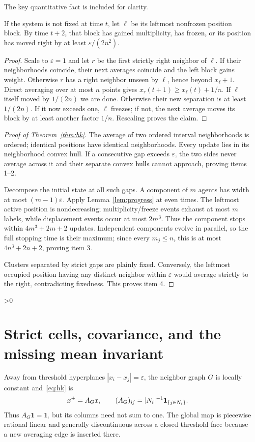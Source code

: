 \documentclass[10pt]{article}
\providecommand{\CRevisionRound}{2}
\begin{document}
The key quantitative fact is included for clarity.
\begin{lemma}\label{lem:progress}
If the system is not fixed at time $t$, let $\ell$ be its leftmost nonfrozen
position block.  By time $t+2$, that block has gained multiplicity, has
frozen, or its position has moved right by at least
$\varepsilon/(2n^2)$.
\end{lemma}
\begin{proof}
Scale to $\varepsilon=1$ and let $r$ be the first strictly right neighbor of
$\ell$.  If their neighborhoods coincide, their next averages coincide and
the left block gains weight.  Otherwise $r$ has a right neighbor unseen by
$\ell$, hence beyond $x_\ell+1$.  Direct averaging over at most $n$ points
gives $x_r(t+1)\ge x_\ell(t)+1/n$.  If $\ell$ itself moved by $1/(2n)$ we
are done.  Otherwise their new separation is at least $1/(2n)$.  If it now
exceeds one, $\ell$ freezes; if not, the next average moves its block by at
least another factor $1/n$.  Rescaling proves the claim.
\end{proof}
\begin{proof}[Proof of Theorem~\ref{thm:hk}]
The average of two ordered interval neighborhoods is ordered; identical
positions have identical neighborhoods.  Every update lies in its
neighborhood convex hull.  If a consecutive gap exceeds $\varepsilon$, the
two sides never average across it and their separate convex hulls cannot
approach, proving items 1--2.

Decompose the initial state at all such gaps.  A component of $m$ agents has
width at most $(m-1)\varepsilon$.  Apply Lemma~\ref{lem:progress} at even
times.  The leftmost active position is nondecreasing; multiplicity/freeze
events exhaust at most $m$ labels, while displacement events occur at most
$2m^3$.  Thus the component stops within $4m^3+2m+2$ updates.  Independent
components evolve in parallel, so the full stopping time is their maximum;
since every $m_j\le n$, this is at most $4n^3+2n+2$, proving item 3.

Clusters separated by strict gaps are plainly fixed.  Conversely, the
leftmost occupied position having any distinct neighbor within
$\varepsilon$ would average strictly to the right, contradicting fixedness.
This proves item 4.
\end{proof}

\ifnum\CRevisionRound>0
\section{Strict cells, covariance, and the missing mean invariant}
Away from threshold hyperplanes $|x_i-x_j|=\varepsilon$, the neighbor graph
$G$ is locally constant and~\eqref{eq:hk} is
\begin{equation}\label{eq:matrix}
 x^+=A_Gx,\qquad (A_G)_{ij}=|N_i|^{-1}{\bf1}_{\{j\in N_i\}}.
\end{equation}
Thus $A_G\mathbf1=\mathbf1$, but its columns need not sum to one.  The global
map is piecewise rational linear and generally discontinuous across a closed
threshold face because a new averaging edge is inserted there.
\end{document}
